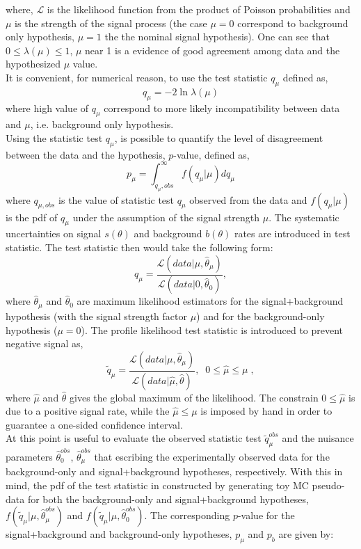 where, $\mathcal{L}$ is the likelihood function from the product of Poisson probabilities and  $\mu$ is the strength of the signal process (the case $\mu =0$ correspond to background only hypothesis, $\mu=1$ the the nominal signal hypothesis).
One can see that $0 \leq  \lambda (\mu) \leq 1 $, $\mu$ near 1 is a evidence of good agreement among data and the hypothesized $\mu$ value.\\
It is convenient, for numerical reason, to use the test statistic $q_{\mu}$ defined as,  
\begin{equation}
 q_{\mu}= -2 \ln \lambda (\mu)  \end{equation}
where high value of $q_{\mu}$ correspond to  more likely incompatibility between data and $\mu$, i.e. background only hypothesis. \\
Using the statistic test  $q_{\mu}$, is possible to quantify the level of disagreement between the data and the hypothesis, $p$-value, defined as,
\begin{equation}
  p_{\mu}=  \int_{ q_{\mu},obs }^{\infty } f(q_{\mu}| \mu  ) dq_{\mu}   \end{equation}
where $ q_{\mu,obs} $ is the value of statistic test $q_{\mu}$ observed from the data and $f(q_{\mu}| \mu  )$ is the pdf of $q_{\mu}$ under the assumption of the signal strength $\mu$.
\newline
The systematic uncertainties on signal $s(\theta)$ and background $b(\theta)$ rates are introduced in test statistic.
The test statistic then would take the following form:
\begin{equation}
 q_{\mu} =\frac{\mathcal{L}(data | \mu, \hat{\theta}_{\mu} )  }{ \mathcal{L}(data |0, \hat{\theta}_0 )},  \end{equation}
where $\hat{\theta}_{\mu}$ and $\hat{\theta}_0$ are maximum likelihood estimators for the signal+background
hypothesis (with the signal strength factor $\mu$) and for the
background-only hypothesis ($\mu =0$). 
The profile likelihood test statistic is introduced to prevent negative signal as,
\begin{equation}
 \tilde{q}_{\mu} =\frac{\mathcal{L}(data | \mu, \hat{\theta}_{\mu} )  }{ \mathcal{L}(data |\hat{\mu}, \hat{\theta} )}, \; \; 0 \leq \hat{\mu} \leq \mu \; ,  \end{equation}
where $\hat{\mu}$ and $\hat{\theta}$ gives the global maximum of the likelihood. 
The constrain  $0 \leq \hat{\mu}$ is due to a positive signal rate, while the   $\hat{\mu} \leq \mu$ is imposed by hand in order to guarantee a one-sided  confidence interval.\\
At this point is useful to evaluate the observed statistic test $\tilde{q}_{\mu}^{obs}$ and the nuisance parameters $\hat{\theta}_0^{obs}$, $\hat{\theta}_{\mu}^{obs}$ that escribing  the  experimentally observed data for the background-only and signal+background hypotheses, respectively.
With this in mind, the pdf of the test statistic in constructed by generating toy MC pseudo-data for both the background-only and signal+background hypotheses, 
$f(\tilde{q}_{\mu}| \mu, \hat{\theta}_{\mu}^{obs}  )$ and $f(\tilde{q}_{\mu}| \mu, \hat{\theta}_{0}^{obs}  )$. The corresponding $p$-value for the
signal+background and background-only hypotheses, $p_{\mu}$ and $p_b$ are given by:



